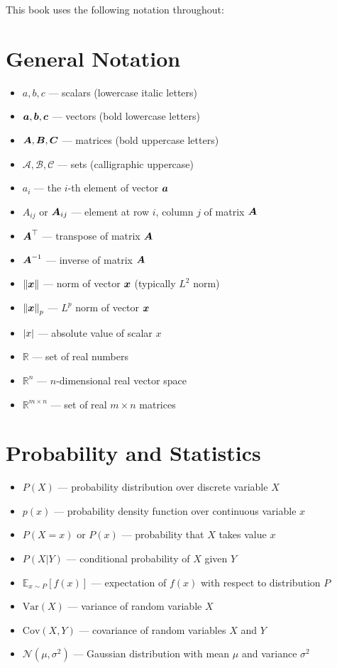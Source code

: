 This book uses the following notation throughout:

\section*{General Notation}

\begin{itemize}[leftmargin=2em]
    \item $a, b, c$ --- scalars (lowercase italic letters)
    \item $\boldsymbol{a}, \boldsymbol{b}, \boldsymbol{c}$ --- vectors (bold lowercase letters)
    \item $\boldsymbol{A}, \boldsymbol{B}, \boldsymbol{C}$ --- matrices (bold uppercase letters)
    \item $\mathcal{A}, \mathcal{B}, \mathcal{C}$ --- sets (calligraphic uppercase)
    \item $a_i$ --- the $i$-th element of vector $\boldsymbol{a}$
    \item $A_{ij}$ or $\boldsymbol{A}_{ij}$ --- element at row $i$, column $j$ of matrix $\boldsymbol{A}$
    \item $\boldsymbol{A}^\top$ --- transpose of matrix $\boldsymbol{A}$
    \item $\boldsymbol{A}^{-1}$ --- inverse of matrix $\boldsymbol{A}$
    \item $\left\lVert\boldsymbol{x}\right\rVert$ --- norm of vector $\boldsymbol{x}$ (typically $L^2$ norm)
    \item $\left\lVert\boldsymbol{x}\right\rVert_p$ --- $L^p$ norm of vector $\boldsymbol{x}$
    \item $\left|x\right|$ --- absolute value of scalar $x$
    \item $\mathbb{R}$ --- set of real numbers
    \item $\mathbb{R}^n$ --- $n$-dimensional real vector space
    \item $\mathbb{R}^{m \times n}$ --- set of real $m \times n$ matrices
\end{itemize}

\section*{Probability and Statistics}

\begin{itemize}[leftmargin=2em]
    \item $P(X)$ --- probability distribution over discrete variable $X$
    \item $p(x)$ --- probability density function over continuous variable $x$
    \item $P(X=x)$ or $P(x)$ --- probability that $X$ takes value $x$
    \item $P(X|Y)$ --- conditional probability of $X$ given $Y$
    \item $\mathbb{E}_{x \sim P}[f(x)]$ --- expectation of $f(x)$ with respect to distribution $P$
    \item $\text{Var}(X)$ --- variance of random variable $X$
    \item $\text{Cov}(X, Y)$ --- covariance of random variables $X$ and $Y$
    \item $\mathcal{N}(\mu, \sigma^2)$ --- Gaussian distribution with mean $\mu$ and variance $\sigma^2$
\end{itemize}

